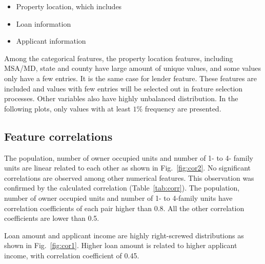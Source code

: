 \documentclass[a4paper,10pt,notitlepage]{article}
\begin{document}
\begin{itemize}
\item{ Property location, which includes}
\item{ Loan information  }
\item{ Applicant information  }
\end{itemize}

Among the categorical features, the property location features, including MSA/MD, state and county have large amount of unique values, and some values only have a few entries.
It is the same case for lender feature. 
These features are included and values with few entries will be selected out in feature selection processes.
Other variables also have highly unbalanced distribution. 
In the following plots, only values with at least $1\%$ frequency are presented.

\subsection{Feature correlations}

The population, number of owner occupied units and number of 1- to 4- family units are linear related to each other as shown in Fig.~\ref{fig:cor2}.
No significant correlations are observed among other numerical features.
This observation was confirmed by the calculated correlation (Table~\ref{tab:corr}). 
The population, number of owner occupied units and number of 1- to 4-family units have correlation coefficients of each pair higher than 0.8. All the other correlation coefficients are lower than 0.5.

Loan amount and applicant income are highly right-screwed distributions as shown in Fig.~\ref{fig:cor1}. Higher loan amount is related to higher applicant income, with correlation coefficient of 0.45. 
\end{document}
